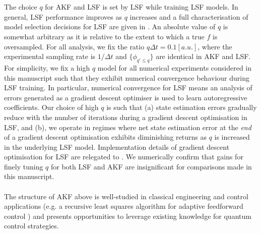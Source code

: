 \\
\\
The choice $q$ for AKF and LSF is set by LSF while training LSF models. In general, LSF performance improves as $q$ increases and a full characterisation of model selection decisions for LSF are given in \cite{mavadia2017}. An absolute value of $q$ is somewhat arbitrary as it is relative to the extent to which a true $f$ is oversampled. For all analysis, we fix the ratio $q \Delta t = 0.1 [a.u.]$, where the experimental sampling rate is $1/\Delta t$ and $\{\phi_{q' \leq q}\}$ are identical in AKF and LSF. For simplicity, we fix a high $q$ model for all numerical experiments considered in this manuscript such that they exhibit numerical convergence behaviour during LSF training. In particular, numerical convergence for LSF means an analysis of errors generated as a gradient descent optimiser is used to learn autoregressive coefficients. Our choice of high $q$ is such that (a) state estimation errors gradually reduce with the number of iterations during a gradient descent optimisation in LSF, and (b), we operate in regimes where net state estimation error at the \textit{end} of a gradient descent optimisation exhibits diminishing returns as $q$ is increased in the underlying LSF model. Implementation details of gradient descent optimisation for LSF are relegated to \cite{mavadia2017}. We numerically confirm that gains for finely tuning $q$ for both LSF and AKF are insignificant for comparisons made in this manuscript.
\\
\\
The structure of AKF above is well-studied in classical engineering and control applications (e.g. a recursive least squares algorithm for adaptive feedforward control \cite{moon2006real} ) and presents opportunities to leverage existing knowledge for quantum control strategies.


